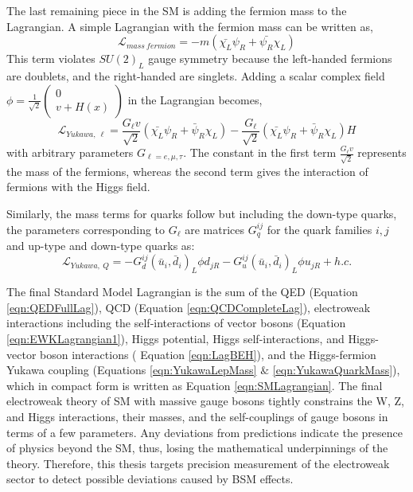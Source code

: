The last remaining piece in the SM is adding the fermion mass to the Lagrangian. A simple Lagrangian with the fermion mass can be written as, 
\begin{equation}
\mathcal{L}_{mass~fermion} = -m(\bar{\chi_{L}}\psi_{R} + \bar{\psi_{R}}\chi_{L})
\label{eqn:FermMass}
\end{equation}
This term violates $SU(2)_{L}$ gauge symmetry because the left-handed fermions are doublets, and the right-handed are singlets. Adding a scalar complex field $\phi =\frac{1}{\sqrt{2}} \begin{pmatrix} 0 \\ v+ H(x) \end{pmatrix}$ in the Lagrangian becomes, 
\begin{equation}
\mathcal{L}_{Yukawa,~\ell} = \frac{G_{\ell}v}{\sqrt{2}} (\bar{\chi_{L}}\psi_{R} + \bar{\psi}_{R}\chi_{L} ) - \frac{G_{\ell}}{\sqrt{2}} (\bar{\chi_{L}}\psi_{R} + \bar{\psi}_{R}\chi_{L} )H
\label{eqn:YukawaLepMass}
\end{equation}
with arbitrary parameters $G_{\ell =e,\mu,\tau}$. The constant in the first term $\frac{G_{\ell}v}{\sqrt{2}}$ represents the mass of the fermions, whereas the second term gives the interaction of fermions with the Higgs field. 

Similarly, the mass terms for quarks follow but including the down-type quarks, the parameters corresponding to $G_{\ell}$ are matrices $G^{ij}_{q}$ for the quark families $i,j$ and up-type and down-type quarks as:
\begin{equation}
\mathcal{L}_{Yukawa,~Q} = -G^{ij}_{d}(\bar{u}_{i} , \bar{d}_{i} )_{L} \phi d_{jR} - G^{ij}_{u}(\bar{u}_{i} , \bar{d}_{i} )_{L} \phi u_{jR} + h.c.
\label{eqn:YukawaQuarkMass}
\end{equation}

The final Standard Model Lagrangian is the sum of the QED (Equation \ref{eqn:QEDFullLag}), QCD (Equation \ref{eqn:QCDCompleteLag}), electroweak interactions including the self-interactions of vector bosons (Equation \ref{eqn:EWKLagrangian1}), Higgs potential, Higgs self-interactions, and Higgs-vector boson interactions ( Equation \ref{eqn:LagBEH}), and the Higgs-fermion Yukawa coupling (Equations \ref{eqn:YukawaLepMass} $\&$ \ref{eqn:YukawaQuarkMass}), which in compact form is written as Equation \ref{eqn:SMLagrangian}. The final electroweak theory of SM with massive gauge bosons tightly constrains the W, Z, and Higgs interactions, their masses, and the self-couplings of gauge bosons in terms of a few parameters. Any deviations from predictions indicate the presence of physics beyond the SM, thus, losing the mathematical underpinnings of the theory. Therefore, this thesis targets precision measurement of the electroweak sector to detect possible deviations caused by BSM effects.